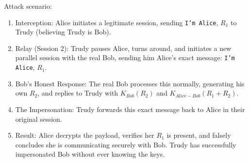 Attack scenario:
\begin{enumerate}
    \item Interception: Alice initiates a legitimate session, sending
    \texttt{I'm Alice}, $R_1$ to Trudy (believing Trudy is Bob).
    
    \item Relay (Session 2): Trudy pauses Alice, turns around, and initiates a
    new parallel session with the real Bob, sending him Alice's exact message:
    \texttt{I'm Alice}, $R_1$.

    \item Bob's Honest Response: The real Bob processes this normally,
    generating his own $R_2$, and replies to Trudy with $K_{Bob}(R_2)$ and
    $K_{Alice-Bob}(R_1 + R_2)$.

    \item The Impersonation: Trudy forwards this exact message back to Alice in
    their original session.

    \item Result: Alice decrypts the payload, verifies her $R_1$ is present, and
    falsely concludes she is communicating securely with Bob. Trudy has
    successfully impersonated Bob without ever knowing the keys.
\end{enumerate}